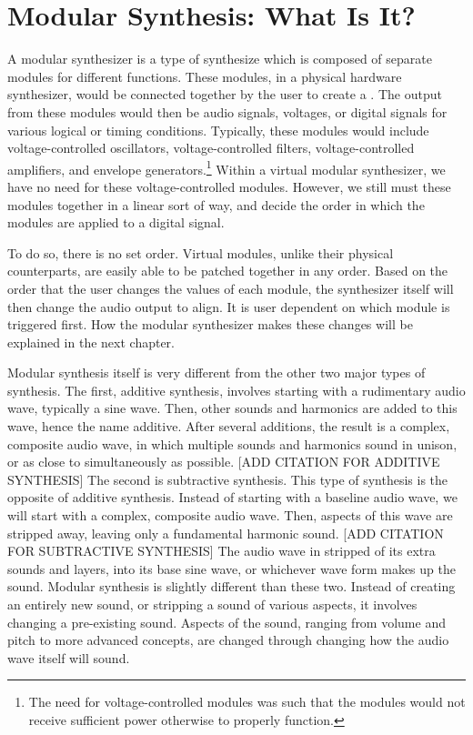 \section[Modular Synthesis: What Is It?]{Modular Synthesis: What Is It?}\label{modular-synth-what-is}

A modular synthesizer is a type of synthesize which is composed of separate modules for different functions. These modules, in a physical hardware synthesizer, would be connected together by the user to create a . The output from these modules would then be audio signals, voltages, or digital signals for various logical or timing conditions. Typically, these modules would include voltage-controlled oscillators, voltage-controlled filters, voltage-controlled amplifiers, and envelope generators.\footnote{The need for voltage-controlled modules was such that the modules would not receive sufficient power otherwise to properly function.} Within a virtual modular synthesizer, we have no need for these voltage-controlled modules. However, we still must  these modules together in a linear sort of way, and decide the order in which the modules are applied to a digital signal. 

To do so, there is no set order. Virtual modules, unlike their physical counterparts, are easily able to be patched together in any order. Based on the order that the user changes the values of each module, the synthesizer itself will then change the audio output to align. It is user dependent on which module is triggered first. How the modular synthesizer makes these changes will be explained in the next chapter. 

Modular synthesis itself is very different from the other two major types of synthesis. The first, additive synthesis, involves starting with a rudimentary audio wave, typically a sine wave. Then, other sounds and harmonics are added to this wave, hence the name additive. After several additions, the result is a complex, composite audio wave, in which multiple sounds and harmonics sound in unison, or as close to simultaneously as possible. [ADD CITATION FOR ADDITIVE SYNTHESIS] The second is subtractive synthesis. This type of synthesis is the opposite of additive synthesis. Instead of starting with a baseline audio wave, we will start with a complex, composite audio wave. Then, aspects of this wave are stripped away, leaving only a fundamental harmonic sound. [ADD CITATION FOR SUBTRACTIVE SYNTHESIS] The audio wave in stripped of its extra sounds and layers, into its base sine wave, or whichever wave form makes up the sound. Modular synthesis is slightly different than these two. Instead of creating an entirely new sound, or stripping a sound of various aspects, it involves changing a pre-existing sound. Aspects of the sound, ranging from volume and pitch to more advanced concepts, are changed through changing how the audio wave itself will sound.